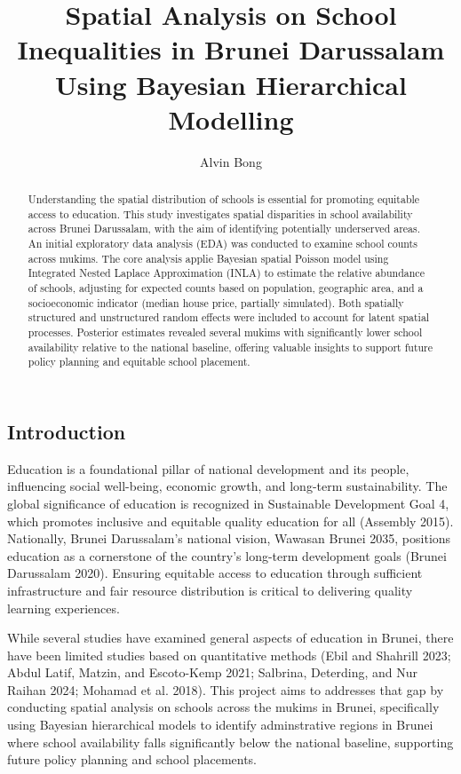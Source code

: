 \documentclass[
  12pt,
]{article}
\title{Spatial Analysis on School Inequalities in Brunei Darussalam
Using Bayesian Hierarchical Modelling}
\author{Alvin Bong}
\date{}
\begin{document}
\maketitle
\begin{abstract}
Understanding the spatial distribution of schools is essential for
promoting equitable access to education. This study investigates spatial
disparities in school availability across Brunei Darussalam, with the
aim of identifying potentially underserved areas. An initial exploratory
data analysis (EDA) was conducted to examine school counts across
mukims. The core analysis applie Bayesian spatial Poisson model using
Integrated Nested Laplace Approximation (INLA) to estimate the relative
abundance of schools, adjusting for expected counts based on population,
geographic area, and a socioeconomic indicator (median house price,
partially simulated). Both spatially structured and unstructured random
effects were included to account for latent spatial processes. Posterior
estimates revealed several mukims with significantly lower school
availability relative to the national baseline, offering valuable
insights to support future policy planning and equitable school
placement.
\end{abstract}


\subsection{Introduction}\label{introduction}

Education is a foundational pillar of national development and its
people, influencing social well-being, economic growth, and long-term
sustainability. The global significance of education is recognized in
Sustainable Development Goal 4, which promotes inclusive and equitable
quality education for all (Assembly 2015). Nationally, Brunei
Darussalam's national vision, Wawasan Brunei 2035, positions education
as a cornerstone of the country's long-term development goals (Brunei
Darussalam 2020). Ensuring equitable access to education through
sufficient infrastructure and fair resource distribution is critical to
delivering quality learning experiences.

While several studies have examined general aspects of education in
Brunei, there have been limited studies based on quantitative methods
(Ebil and Shahrill 2023; Abdul Latif, Matzin, and Escoto-Kemp 2021;
Salbrina, Deterding, and Nur Raihan 2024; Mohamad et al. 2018). This
project aims to addresses that gap by conducting spatial analysis on
schools across the mukims in Brunei, specifically using Bayesian
hierarchical models to identify adminstrative regions in Brunei where
school availability falls significantly below the national baseline,
supporting future policy planning and school placements.
\end{document}
